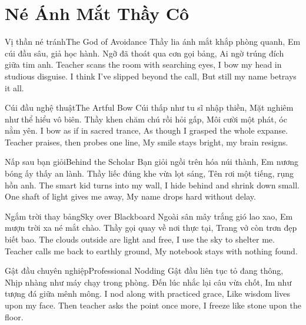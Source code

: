 \chapter{Né Ánh Mắt Thầy Cô}

\begin{tutuyetbox}{Vị thần né tránh}{The God of Avoidance}
Thầy lia ánh mắt khắp phòng quanh,
Em cúi đầu sâu, giả học hành.
Ngỡ đã thoát qua cơn gọi bảng,
Ai ngờ trúng đích giữa tim anh.
\tcblower
Teacher scans the room with searching eyes,
I bow my head in studious disguise.
I think I've slipped beyond the call,
But still my name betrays it all.
\end{tutuyetbox}

\begin{tutuyetbox}{Cúi đầu nghệ thuật}{The Artful Bow}
Cúi thấp như tu sĩ nhập thiền,
Mặt nghiêm như thể hiểu vô biên.
Thầy khen chăm chú rồi hỏi gấp,
Môi cười một phát, óc nằm yên.
\tcblower
I bow as if in sacred trance,
As though I grasped the whole expanse.
Teacher praises, then probes one line,
My smile stays bright, my brain resigns.
\end{tutuyetbox}

\begin{tutuyetbox}{Nấp sau bạn giỏi}{Behind the Scholar}
Bạn giỏi ngồi trên hóa núi thành,
Em nương bóng ấy thấy an lành.
Thầy liếc đúng khe vừa lọt sáng,
Tên rơi một tiếng, rụng hồn anh.
\tcblower
The smart kid turns into my wall,
I hide behind and shrink down small.
One shaft of light gives me away,
My name drops hard without delay.
\end{tutuyetbox}

\begin{tutuyetbox}{Ngắm trời thay bảng}{Sky over Blackboard}
Ngoài sân mây trắng gió lao xao,
Em mượn trời xa né mắt chào.
Thầy gọi quay về nơi thực tại,
Trang vở còn trơn đẹp biết bao.
\tcblower
The clouds outside are light and free,
I use the sky to shelter me.
Teacher calls me back to earthly ground,
My notebook stays with nothing found.
\end{tutuyetbox}

\begin{tutuyetbox}{Gật đầu chuyên nghiệp}{Professional Nodding}
Gật đầu liên tục tỏ đang thông,
Nhịp nhàng như máy chạy trong phòng.
Đến lúc nhắc lại câu vừa chốt,
Im như tượng đá giữa mênh mông.
\tcblower
I nod along with practiced grace,
Like wisdom lives upon my face.
Then teacher asks the point once more,
I freeze like stone upon the floor.
\end{tutuyetbox}

